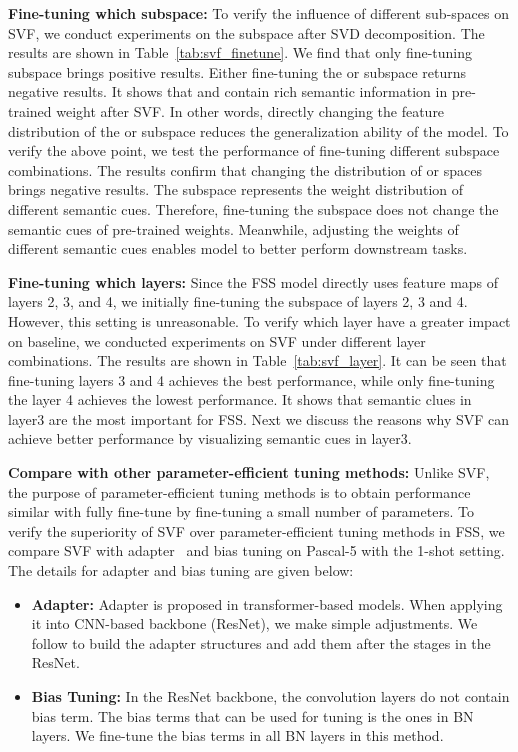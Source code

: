 \documentclass{article}
\begin{document}
\textbf{Fine-tuning which subspace:} To verify the influence of different sub-spaces on SVF, we conduct experiments on the subspace after SVD decomposition. The results are shown in Table~\ref{tab:svf_finetune}. We find that only fine-tuning  subspace brings positive results. Either fine-tuning the  or  subspace returns negative results. It shows that  and  contain rich semantic information in pre-trained weight after SVF. In other words, directly changing the feature distribution of the  or  subspace reduces the generalization ability of the model. To verify the above point, we test the performance of fine-tuning different subspace combinations. The results confirm that changing the distribution of  or  spaces brings negative results. The subspace  represents the weight distribution of different semantic cues. Therefore, fine-tuning the subspace  does not change the semantic cues of pre-trained weights. Meanwhile, adjusting the weights of different semantic cues enables model to better perform downstream tasks.

\textbf{Fine-tuning which layers:} Since the FSS model directly uses feature maps of layers 2, 3, and 4, we initially fine-tuning the subspace  of layers 2, 3 and 4. However, this setting is unreasonable. To verify which layer  have a greater impact on baseline, we conducted experiments on SVF under different layer combinations. The results are shown in Table~\ref{tab:svf_layer}. It can be seen that fine-tuning layers 3 and 4 achieves the best performance, while only fine-tuning the layer 4 achieves the lowest performance. It shows that semantic clues in layer3 are the most important for FSS. Next we discuss the reasons why SVF can achieve better performance by visualizing semantic cues in layer3.

\textbf{Compare with other parameter-efficient tuning methods:} Unlike SVF, the purpose of parameter-efficient tuning methods is to obtain performance similar with fully fine-tune by fine-tuning a small number of parameters. To verify the superiority of SVF over parameter-efficient tuning methods in FSS, we compare SVF with adapter~\cite{houlsby2019parameter} and bias tuning on Pascal-5 with the 1-shot setting. The details for adapter and bias tuning are given below:

\begin{itemize}[itemsep=2pt,topsep=0pt,parsep=0pt]
\item\textbf{Adapter:} Adapter is proposed in transformer-based models. When applying it into CNN-based backbone (ResNet), we make simple adjustments. We follow \cite{houlsby2019parameter} to build the adapter structures and add them after the stages in the ResNet.

\item\textbf{Bias Tuning:} In the ResNet backbone, the convolution layers do not contain bias term. The bias terms that can be used for tuning is the ones in BN layers. We fine-tune the bias terms in all BN layers in this method.
\end{itemize}
\end{document}
